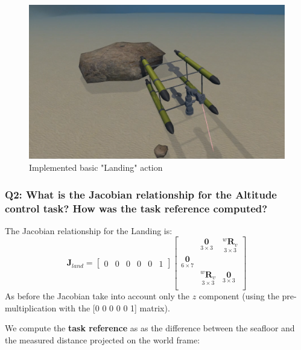 \documentclass{article}
\begin{document}
\begin{figure}[h]
    \centering
    \includegraphics[scale=0.4]{211_Landing.png}
    \caption{Implemented basic "Landing" action}
    \label{images_2_3_1}
\end{figure}

\subsubsection{Q2: What is the Jacobian relationship for the Altitude control task? How was the task reference computed?}

\noindent
\vspace{5px}
The Jacobian relationship for the Landing is:
\begin{equation}
\boldsymbol{J}_{land}=\begin{bmatrix} 0 & 0 & 0 & 0 & 0 & 1
\end{bmatrix}
    \begin{bmatrix}
     & \underset{3\times 3}{\boldsymbol{0}} & \underset{ 3\times 3}{^{w}\boldsymbol{R}_{v}} \\
     \underset{6\times 7}{\boldsymbol{0}} \\
     & \underset{ 3\times 3}{^{w}\boldsymbol{R}_{v}} & \underset{3\times 3}{\boldsymbol{0}} \\
    \end{bmatrix}
\end{equation}
As before the Jacobian take into account only the $z$ component (using the pre-multiplication with the [0 0 0 0 0 1] matrix).
 
\noindent
\vspace{5px}
We compute the \textbf{task reference} as as the difference between the seafloor and the measured distance projected on the world frame:
\end{document}

